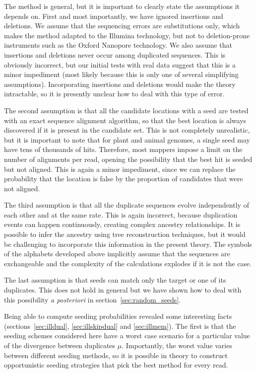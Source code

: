 \documentclass{article}
\begin{document}
The method is general, but it is important to clearly state the
assumptions it depends on. First and most importantly, we have ignored
insertions and deletions. We assume that the sequencing errors are
substitutions only, which makes the method adapted to the Illumina
technology, but not to deletion-prone instruments such as the Oxford
Nanopore technology. We also assume that insertions and deletions never
occur among duplicated sequences. This is obviously incorrect, but our
initial tests with real data suggest that this is a minor impediment (most
likely because this is only one of several simplifying assumptions).
Incorporating insertions and deletions would make the theory intractable,
so it is presently unclear how to deal with this type of error.

The second assumption is that all the candidate locations with a seed are
tested with an exact sequence alignment algorithm, so that the best
location is always discovered if it is present in the candidate set. This
is not completely unrealistic, but it is important to note that for plant
and animal genomes, a single seed may have tens of thousands of hits.
Therefore, most mappers impose a limit on the number of alignments per
read, opening the possibility that the best hit is seeded but not aligned.
This is again a minor impediment, since we can replace the probability
that the location is false by the proportion of candidates that were not
aligned.

The third assumption is that all the duplicate sequences evolve
independently of each other and at the same rate. This is again incorrect,
because duplication events can happen continuously, creating complex
ancestry relationships. It is possible to infer the ancestry using tree
reconstruction techniques, but it would be challenging to incorporate this
information in the present theory. The symbols of the alphabets developed
above implicitly assume that the sequences are exchangeable and the
complexity of the calculations explodes if it is not the case.

The last assumption is that seeds can match only the target or one of its
duplicates. This does not hold in general but we have shown how to deal
with this possibility \textit{a posteriori} in
section~\ref{sec:random_seeds}.

Being able to compute seeding probabilities revealed some interesting
facts (sections~\ref{sec:illdual}, \ref{sec:illskipdual} and
\ref{sec:illmem}). The first is that the seeding schemes considered here
have a worst case scenario for a particular value of the divergence
between duplicates $\mu$. Importantly, the worst value varies between
different seeding methods, so it is possible in theory to construct
opportunistic seeding strategies that pick the best method for every read.
\end{document}
